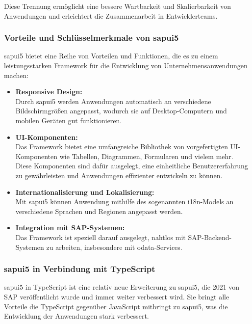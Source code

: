 Diese Trennung ermöglicht eine bessere Wartbarkeit und Skalierbarkeit von Anwendungen und erleichtert die Zusammenarbeit in Entwicklerteams.

\subsubsection[Vorteile und Schlüsselmerkmale von \gls{sapui5}]{Vorteile und Schlüsselmerkmale von \gls{sapui5}}
\gls{sapui5} bietet eine Reihe von Vorteilen und Funktionen, die es zu einem leistungsstarken Framework für die Entwicklung von Unternehmensanwendungen machen:

\begin{itemize}
    \item \textbf{Responsive Design:} \\
    Durch \gls{sapui5} werden Anwendungen automatisch an verschiedene Bildschirmgrößen angepasst, wodurch sie auf Desktop-Computern und mobilen Geräten gut funktionieren.
    \item \textbf{UI-Komponenten:} \\
    Das Framework bietet eine umfangreiche Bibliothek von vorgefertigten UI-Komponenten wie Tabellen, Diagrammen, Formularen und vielem mehr.
    Diese Komponenten sind dafür ausgelegt, eine einheitliche Benutzererfahrung zu gewährleisten und Anwendungen effizienter entwickeln zu können.
    \item \textbf{Internationalisierung und Lokalisierung:} \\
    Mit \gls{sapui5} können Anwendung mithilfe des sogenannten i18n-Models an verschiedene Sprachen und Regionen angepasst werden. 
    \item \textbf{Integration mit SAP-Systemen:} \\
    Das Framework ist speziell darauf ausgelegt, nahtlos mit SAP-Backend-Systemen zu arbeiten, insbesondere mit \gls{odata}-Services.
\end{itemize}

\subsubsection[\gls{sapui5} in Verbindung mit TypeScript]{\gls{sapui5} in Verbindung mit TypeScript}
\gls{sapui5} in TypeScript ist eine relativ neue Erweiterung zu \gls{sapui5}, die 2021 von SAP veröffentlicht wurde und immer weiter verbessert wird.
Sie bringt alle Vorteile die TypeScript gegenüber JavaScript mitbringt zu \gls{sapui5}, was die Entwicklung der Anwendungen stark verbessert.

